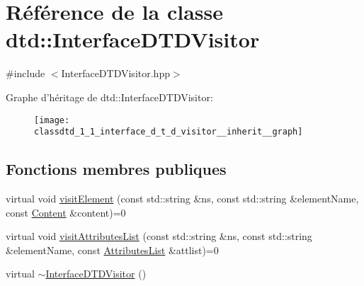 \hypertarget{classdtd_1_1_interface_d_t_d_visitor}{
\section{Référence de la classe dtd::InterfaceDTDVisitor}
\label{classdtd_1_1_interface_d_t_d_visitor}
}


{\ttfamily \#include $<$InterfaceDTDVisitor.hpp$>$}



Graphe d'héritage de dtd::InterfaceDTDVisitor:\nopagebreak
\begin{figure}[H]
\begin{center}
\leavevmode
\texttt{[image: classdtd\_1\_1\_interface\_d\_t\_d\_visitor\_\_inherit\_\_graph]}
\end{center}
\end{figure}
\subsection*{Fonctions membres publiques}
\begin{DoxyCompactItemize}
\item 
virtual void \hyperlink{classdtd_1_1_interface_d_t_d_visitor_a46b882a06961ea04fd43b2a9d937118b}{visitElement} (const std::string \&ns, const std::string \&elementName, const \hyperlink{classdtd_1_1_content}{Content} \&content)=0
\item 
virtual void \hyperlink{classdtd_1_1_interface_d_t_d_visitor_a729d9fcb360d9bf45210aac109b388da}{visitAttributesList} (const std::string \&ns, const std::string \&elementName, const \hyperlink{namespacedtd_a8d5d29abb5de0468925f321597f57f4b}{AttributesList} \&attlist)=0
\item 
virtual \hyperlink{classdtd_1_1_interface_d_t_d_visitor_aef94cba5e56a7891a24b236176a2075a}{$\sim$InterfaceDTDVisitor} ()
\end{DoxyCompactItemize}
